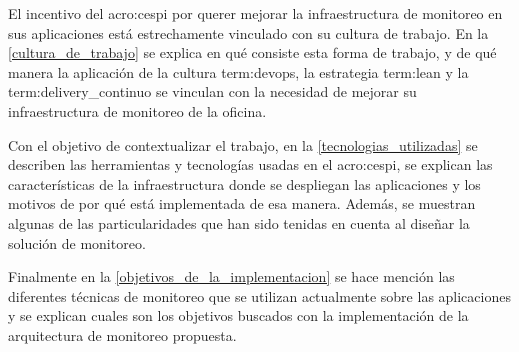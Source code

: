 El incentivo del \gls{acro:cespi} por querer mejorar la infraestructura de
monitoreo en sus aplicaciones está estrechamente vinculado con su cultura de
trabajo. En la \autoref{cultura_de_trabajo} se explica en qué consiste esta
forma de trabajo, y de qué manera la aplicación de la cultura \gls{term:devops},
la estrategia \gls{term:lean} y la \gls{term:delivery_continuo} se vinculan con
la necesidad de mejorar su infraestructura de monitoreo de la oficina.

Con el objetivo de contextualizar el trabajo, en la
\autoref{tecnologias_utilizadas} se describen las herramientas y tecnologías
usadas en el \gls{acro:cespi}, se explican las características de la
infraestructura donde se despliegan las aplicaciones y los motivos de por qué
está implementada de esa manera. Además, se muestran algunas de las
particularidades que han sido tenidas en cuenta al diseñar la solución de
monitoreo.

Finalmente en la \autoref{objetivos_de_la_implementacion} se hace mención
las diferentes técnicas de monitoreo que se utilizan actualmente sobre las
aplicaciones y se explican cuales son los objetivos buscados con la
implementación de la arquitectura de monitoreo propuesta.
